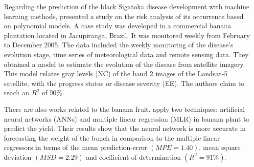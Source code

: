 Regarding the prediction of the black Sigatoka disease development
with machine learning methods, \citet{Bendini2013} presented a study
on the risk analysis of its occurrence based on polynomial models.
%
A case study was developed in a commercial banana plantation located
in Jacupiranga, Brazil. It was monitored weekly from February to
December 2005.
%
The data included the weekly monitoring of the disease’s evolution
stage, time series of meteorological data and remote sensing
data.
%
They obtained a model to estimate the evolution of the disease from
satellite imagery. This model relates gray levels (NC) of the band 2
images of the Landsat-5 satellite, with the progress status or disease
severity (EE). The authors claim to reach an $R^2$ of 90\%.

There are also works related to the banana fruit. \citet{Soares2014}
apply two techniques: artificial neural networks (ANNs) and multiple
linear regression (MLR) in banana plant to predict the yield.
%
Their results show that the neural network is more accurate in
forecasting the weight of the bunch in comparison to the multiple
linear regressors in terms of the mean prediction-error $(MPE =
1.40)$, mean square deviation $(MSD = 2.29)$ and coefficient of
determination $(R^2 = 91\%)$.

%

